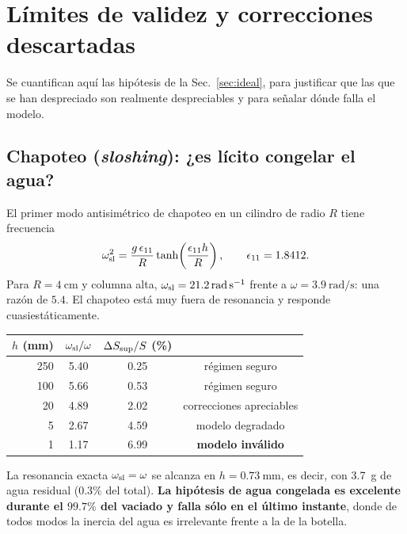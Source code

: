 \documentclass[11pt,a4paper]{article}
\begin{document}
\section{Límites de validez y correcciones descartadas}
\label{sec:validez}

Se cuantifican aquí las hipótesis de la Sec.~\ref{sec:ideal}, para justificar que las que se han
despreciado son realmente despreciables y para señalar dónde falla el modelo.

\subsection{Chapoteo (\emph{sloshing}): ¿es lícito congelar el agua?}

El primer modo antisimétrico de chapoteo en un cilindro de radio $R$ tiene frecuencia
\begin{equation}
\omega_{\rm sl}^2 = \frac{g\,\epsilon_{11}}{R}\tanh\!\left(\frac{\epsilon_{11}h}{R}\right),
\qquad \epsilon_{11}=1.8412 .
\end{equation}
Para $R=\SI{4}{\centi\meter}$ y columna alta, $\omega_{\rm sl}=\SI{21.2}{\radian\per\second}$
frente a $\omega=\SI{3.9}{\radian\per\second}$: una razón de $5.4$. El chapoteo está muy fuera de
resonancia y responde cuasiestáticamente.

\begin{center}
\begin{tabular}{@{}rccc@{}}
\toprule
$h$ (mm) & $\omega_{\rm sl}/\omega$ & $\Delta S_{\rm sup}/S$ (\%) & \\
\midrule
250 & 5.40 & 0.25 & régimen seguro\\
100 & 5.66 & 0.53 & régimen seguro\\
 20 & 4.89 & 2.02 & correcciones apreciables\\
  5 & 2.67 & 4.59 & modelo degradado\\
  1 & 1.17 & 6.99 & \textbf{modelo inválido}\\
\bottomrule
\end{tabular}
\end{center}

\noindent
La resonancia exacta $\omega_{\rm sl}=\omega$ se alcanza en $h=\SI{0.73}{\milli\meter}$, es decir,
con \SI{3.7}{\gram} de agua residual ($0.3\%$ del total). \textbf{La hipótesis de agua congelada es
excelente durante el $99.7\%$ del vaciado y falla sólo en el último instante}, donde de todos modos
la inercia del agua es irrelevante frente a la de la botella.
\end{document}
